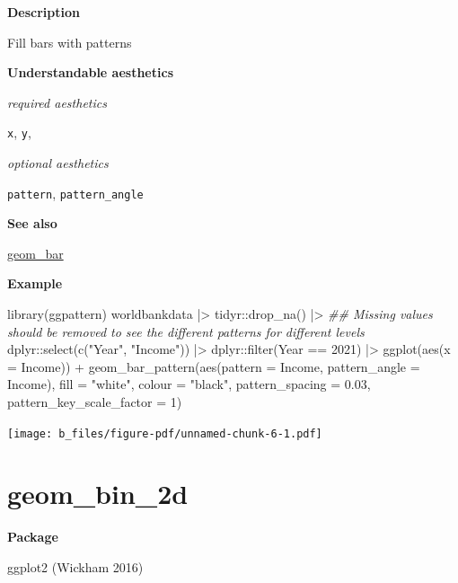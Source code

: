 \documentclass[
  letterpaper,
  DIV=11,
  numbers=noendperiod]{scrreprt}
\newenvironment{Shaded}{\begin{snugshade}}{\end{snugshade}}
\newcommand{\AttributeTok}[1]{\textcolor[rgb]{0.40,0.45,0.13}{#1}}
\newcommand{\DecValTok}[1]{\textcolor[rgb]{0.68,0.00,0.00}{#1}}
\newcommand{\DocumentationTok}[1]{\textcolor[rgb]{0.37,0.37,0.37}{\textit{#1}}}
\newcommand{\FloatTok}[1]{\textcolor[rgb]{0.68,0.00,0.00}{#1}}
\newcommand{\FunctionTok}[1]{\textcolor[rgb]{0.28,0.35,0.67}{#1}}
\newcommand{\NormalTok}[1]{\textcolor[rgb]{0.00,0.23,0.31}{#1}}
\newcommand{\SpecialCharTok}[1]{\textcolor[rgb]{0.37,0.37,0.37}{#1}}
\newcommand{\StringTok}[1]{\textcolor[rgb]{0.13,0.47,0.30}{#1}}
\begin{document}
\textbf{Description}

Fill bars with patterns

\textbf{Understandable aesthetics}

\emph{required aesthetics}

\texttt{x}, \texttt{y},

\emph{optional aesthetics}

\texttt{pattern}, \texttt{pattern\_angle}

\textbf{See also}

\hyperref[bar]{geom\_bar}

\textbf{Example}

\begin{Shaded}
\begin{Highlighting}[]
\FunctionTok{library}\NormalTok{(ggpattern)}
\NormalTok{worldbankdata }\SpecialCharTok{|\textgreater{}}
\NormalTok{  tidyr}\SpecialCharTok{::}\FunctionTok{drop\_na}\NormalTok{() }\SpecialCharTok{|\textgreater{}} \DocumentationTok{\#\# Missing values should be removed to see the different patterns for different levels}
\NormalTok{  dplyr}\SpecialCharTok{::}\FunctionTok{select}\NormalTok{(}\FunctionTok{c}\NormalTok{(}\StringTok{"Year"}\NormalTok{, }\StringTok{"Income"}\NormalTok{)) }\SpecialCharTok{|\textgreater{}}
\NormalTok{  dplyr}\SpecialCharTok{::}\FunctionTok{filter}\NormalTok{(Year }\SpecialCharTok{==} \DecValTok{2021}\NormalTok{) }\SpecialCharTok{|\textgreater{}}
  \FunctionTok{ggplot}\NormalTok{(}\FunctionTok{aes}\NormalTok{(}\AttributeTok{x =}\NormalTok{ Income)) }\SpecialCharTok{+}
  \FunctionTok{geom\_bar\_pattern}\NormalTok{(}\FunctionTok{aes}\NormalTok{(}\AttributeTok{pattern =}\NormalTok{ Income, }\AttributeTok{pattern\_angle =}\NormalTok{ Income), }\AttributeTok{fill =} \StringTok{"white"}\NormalTok{, }\AttributeTok{colour =} \StringTok{"black"}\NormalTok{, }\AttributeTok{pattern\_spacing =} \FloatTok{0.03}\NormalTok{, }\AttributeTok{pattern\_key\_scale\_factor =} \DecValTok{1}\NormalTok{)}
\end{Highlighting}
\end{Shaded}

\texttt{[image: b\_files/figure-pdf/unnamed-chunk-6-1.pdf]}

\section{geom\_bin\_2d}\label{bin2d}

\textbf{Package}

ggplot2 (Wickham 2016)
\end{document}
